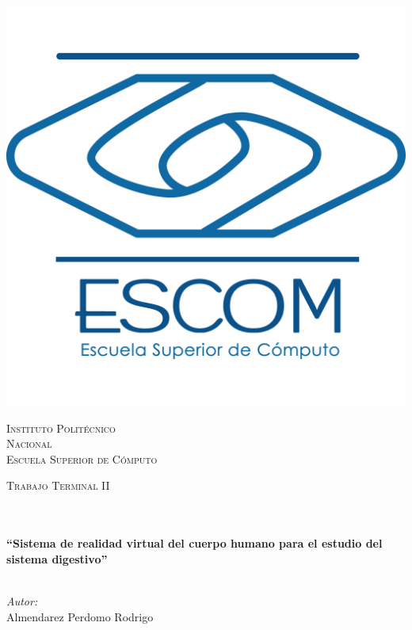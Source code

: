 \documentclass[11pt,letter]{report}
\begin{document}
\begin{center}
\begin{minipage}{0.48\textwidth}
\begin{flushright}
\includegraphics[scale = 0.08]{images/escom.png}
\end{flushright}\end{minipage}
\vspace*{1.5cm}
\textsc{\huge Instituto Polit\'ecnico\\ \vspace{5px} Nacional}\\[1.5cm]
\textsc{\LARGE Escuela Superior de C\'omputo}\\[1.5cm]
\begin{minipage}{0.9\textwidth} 
\begin{center}
\textsc{\LARGE Trabajo Terminal II}
\end{center}
\end{minipage}\\[0.5cm]
\vspace*{1cm}
\HRule \\[0.4cm]
{ \huge \bfseries “Sistema de realidad virtual del cuerpo humano para el estudio del sistema digestivo”
}\\[0.4cm]
\HRule \\[1.5cm]
\begin{minipage}{0.46\textwidth}
\begin{flushleft} \large
\emph{Autor:}\\	
Almendarez Perdomo Rodrigo\\

\end{flushleft}
\end{minipage}
\end{center}
\end{document}
